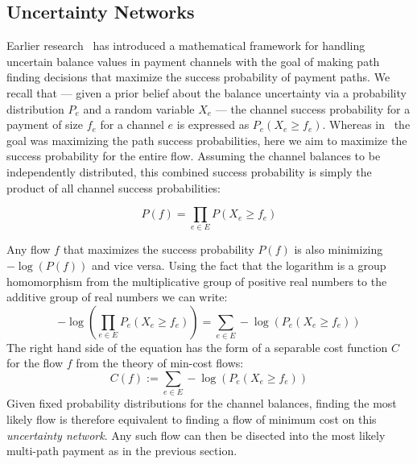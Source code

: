 \documentclass[10pt,twocolumn]{article}
\begin{document}
\subsection{Uncertainty Networks}
Earlier research~\cite{pickhardt2021security} has introduced a mathematical framework for handling uncertain balance values in payment channels with the goal of making path finding decisions that maximize the success probability of payment paths.
We recall that --- given a prior belief about the balance uncertainty via a probability distribution $P_e$ and a random variable $X_e$ ---  the channel success probability for a payment of size $f_e$ for a channel $e$ is expressed as $P_e(X_e\geq f_e)$.
Whereas in~\cite{pickhardt2021security} the goal was maximizing the path success probabilities, here we aim to maximize the success probability for the entire flow. Assuming the channel balances to be independently distributed, this combined success probability is simply the product of all channel success probabilities:

\[
P(f)=\prod_{e\in E}P(X_{e} \geq f_e)
\]

Any flow $f$ that maximizes the success probability $P(f)$ is also minimizing $-\log\left(P(f)\right)$ and vice versa.
Using the fact that the logarithm is a group homomorphism from the multiplicative group of positive real numbers to the additive group of real numbers we can write:
\[
-\log\left(\prod_{e\in E}P_e(X_{e} \geq f_e)\right) = \sum_{e\in E}-\log\left(P_e(X_e \geq f_e)\right)
\]
The right hand side of the equation has the form of a separable cost function $C$ for the flow $f$ from the theory of min-cost flows:
\[
C(f) := \sum_{e\in E}-\log\left(P_e(X_e \geq f_e)\right)
\]
Given fixed probability distributions for the channel balances, finding the most likely flow is therefore equivalent to finding a flow of minimum cost on this \emph{uncertainty network}. Any such flow can then be disected into the most likely multi-path payment as in the previous section.
\end{document}
